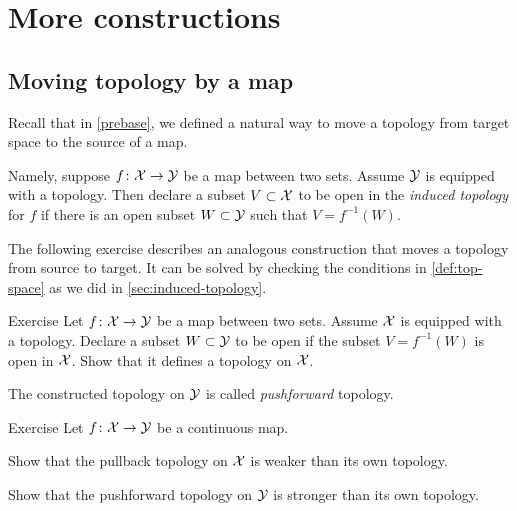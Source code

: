 \chapter{More constructions}

\section{Moving topology by a map}

Recall that in \ref{prebase}, we defined a natural way to move a topology from target space to the source of a map.

Namely, suppose $f\colon\mathcal{X}\to\mathcal{Y}$ be a map between two sets.
Assume $\mathcal{Y}$ is equipped with a topology.
Then declare a subset $V\subset\mathcal{X}$ to be open in the \emph{induced topology} for $f$ if there is an open subset $W\subset\mathcal{Y}$ 
such that $V=f^{-1}(W)$.

The following exercise describes an analogous construction that moves a topology from source to target.
It can be solved by checking the conditions in \ref{def:top-space} as we did in \ref{sec:induced-topology}.

\begin{thm}{Exercise}\label{ex:move-topology:pushforward}
Let $f\colon\mathcal{X}\to\mathcal{Y}$ be a map between two sets.
Assume $\mathcal{X}$ is equipped with a topology.
Declare a subset $W\subset\mathcal{Y}$ to be open if the subset $V=f^{-1}(W)$ is open in $\mathcal{X}$.
Show that it defines a topology on $\mathcal{X}$.

\end{thm}

The constructed topology on $\mathcal{Y}$ is called \emph{pushforward} topology.

\begin{thm}{Exercise}\label{ex:pullback/pushforward}
Let $f\colon\mathcal{X}\to\mathcal{Y}$ be a continuous map.

\begin{subthm}{}
Show that the pullback topology on $\mathcal{X}$ is weaker than its own topology.
\end{subthm}

\begin{subthm}{}
Show that the pushforward topology on $\mathcal{Y}$ is stronger than its own topology.
\end{subthm}

\end{thm}

